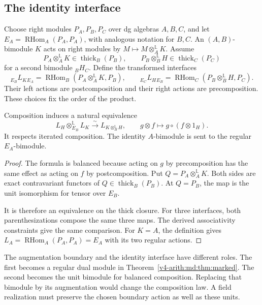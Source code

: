 \subsection{The identity interface}

Choose right modules $P_A,P_B,P_C$ over dg algebras $A,B,C$,
and let $E_A=\operatorname{RHom}_A(P_A,P_A)$, with analogous
notation for $B,C$. An $(A,B)$-bimodule $K$ acts on right
modules by $M\mapsto M\otimes_A^{\mathbb L}K$.
Assume
\[
 P_A\otimes_A^{\mathbb L}K\in\operatorname{thick}_B(P_B),
 \qquad P_B\otimes_B^{\mathbb L}H\in\operatorname{thick}_C(P_C)
\]
for a second bimodule ${}_BH_C$. Define the transformed interfaces
\[
 {}_{E_B}L_K{}_{E_A}
 =\operatorname{RHom}_B(P_A\otimes_A^{\mathbb L}K,P_B),
 \qquad
 {}_{E_C}L_H{}_{E_B}
 =\operatorname{RHom}_C(P_B\otimes_B^{\mathbb L}H,P_C).
\]
Their left actions are postcomposition and their right actions
are precomposition. These choices fix the order of the product.

\begin{proposition}
\label{v4-arith:md:prop:interfaces}
Composition induces a natural equivalence
\begin{equation}\label{v4-arith:md:eq:interfaces}
 L_H\otimes_{E_B}^{\mathbb L}L_K
 \xrightarrow{\sim}L_{K\otimes_B^{\mathbb L}H},
 \qquad g\otimes f\longmapsto g\circ(f\otimes1_H).
\end{equation}
It respects iterated composition. The identity $A$-bimodule
is sent to the regular $E_A$-bimodule.
\end{proposition}

\begin{proof}
The formula is balanced because acting on $g$ by precomposition
has the same effect as acting on $f$ by postcomposition.
Put $Q=P_A\otimes_A^{\mathbb L}K$. Both sides are exact
contravariant functors of $Q\in\operatorname{thick}_B(P_B)$.
At $Q=P_B$, the map is the unit isomorphism for tensor over
$E_B$.

It is therefore an equivalence on the thick closure.
For three interfaces, both parenthesizations compose the same
three maps. The derived associativity constraints give the same
comparison. For $K=A$, the definition gives
$L_A=\operatorname{RHom}_A(P_A,P_A)=E_A$ with its two regular
actions.
\end{proof}

The augmentation boundary and the identity interface have different
roles. The first becomes a regular dual module in
Theorem~\ref{v4-arith:md:thm:marked}. The second becomes the unit
bimodule for balanced composition. Replacing that bimodule by its
augmentation would change the composition law. A field realization
must preserve the chosen boundary action as well as these units.

